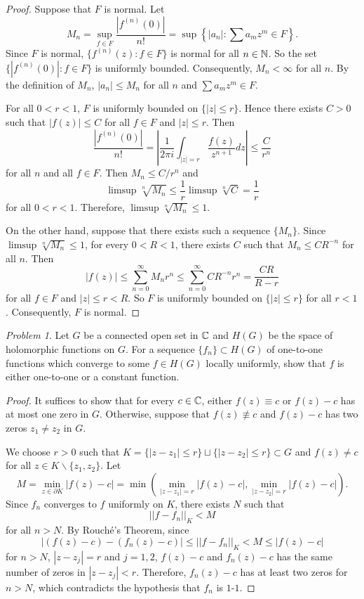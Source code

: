 \documentclass[11pt]{amsart}
\theoremstyle{remark}
\newtheorem{prob}{Problem}[section]
\theoremstyle{definition}
\numberwithin{equation}{section}
\begin{document}
\begin{proof}
    Suppose that $F$ is normal. Let
    \[
        M_n = \sup_{f\in F} \frac{|f^{(n)}(0)|}{n!} = \sup \left\{
        |a_n|: \sum a_m z^m \in F
        \right\}.
    \]
    Since $F$ is normal, $\{f^{(n)}(z): f\in F
        \}$ is normal for all $n\in {\mathbb N}$. So the set $\{|f^{(n)}(0)|: f\in F\}$ is uniformly bounded. Consequently, $M_n <\infty$ for all $n$. By the definition of $M_n$, $|a_n| \le M_n$ for all $n$ and $\sum a_m z^m \in F$.

    For all $0< r<1$, $F$ is uniformly bounded on $\{|z|\le r\}$. Hence there exists $C>0$ such that $|f(z)| \le C$ for all $f\in F$ and $|z|\le r$. Then
    \[
        \frac{|f^{(n)}(0)|}{n!} = \left|
        \frac{1}{2\pi i} \int_{|z|=r} \frac{f(z)}{z^{n+1}} dz
        \right| \le \frac{C}{r^n}
    \]
    for all $n$ and all $f\in F$. Then $M_n \le C/r^n$ and
    \[
        \limsup \sqrt[n]{M_n} \le \frac{1}r \limsup \sqrt[n]{C} = \frac{1}r
    \]
    for all $0< r<1$. Therefore, $\limsup \sqrt[n]{M_n}\le 1$.

    On the other hand, suppose that there exists such a sequence $\{M_n\}$. Since $\limsup \sqrt[n]{M_n}\le 1$, for every $0<R<1$, there exists $C$ such that $M_n \le C R^{-n}$ for all $n$. Then
    \[
        |f(z)| \le \sum_{n=0}^\infty M_n r^n \le \sum_{n=0}^\infty CR^{-n}r^n =\frac{CR}{R-r}
    \]
    for all $f\in F$ and $|z|\le r < R$. So $F$ is uniformly bounded on $\{|z|\le r\}$ for all $r < 1$. Consequently, $F$ is normal.
\end{proof}

\begin{prob}
    Let $G$ be a connected open set in ${\mathbb C}$ and $H(G)$ be the space of holomorphic functions on $G$. For a sequence $\{f_n\}\subset H(G)$ of one-to-one functions which converge
    to some $f\in H(G)$ locally uniformly, show that $f$ is either one-to-one or a constant function.
\end{prob}

\begin{proof}
    It suffices to show that for every $c\in {\mathbb C}$, either $f(z)\equiv c$ or $f(z) - c$ has at most one zero in $G$. Otherwise, suppose that $f(z)\not\equiv c$ and $f(z) - c$ has two zeros $z_1\ne z_2$ in $G$.

    We choose $r>0$ such that $K = \{|z - z_1| \le r\}\sqcup \{|z - z_2| \le r\}\subset G$ and $f(z)\ne c$ for all $z\in K\backslash \{z_1,z_2\}$. Let
    \[
        M = \min_{z\in \partial K} |f(z) - c| = \min\left(
        \min_{|z-z_1|=r} |f(z) - c|, \min_{|z-z_2|=r} |f(z) - c|
        \right).
    \]
    Since $f_n$ converges to $f$ uniformly on $K$, there exists $N$ such that
    \[
        ||f - f_n||_K < M
    \]
    for all $n > N$. By Rouch\'e's Theorem, since
    \[
        |(f(z)-c) - (f_n(z) - c)| \le ||f-f_n||_K < M \le |f(z)-c|
    \]
    for $n>N$, $|z-z_j|=r$ and $j=1,2$, $f(z)-c$ and $f_n(z)-c$ has the same number of zeros in $|z-z_j| < r$. Therefore, $f_n(z) - c$ has at least two zeros for $n>N$, which contradicts the hypothesis that $f_n$ is $1$-$1$.
\end{proof}
\end{document}

